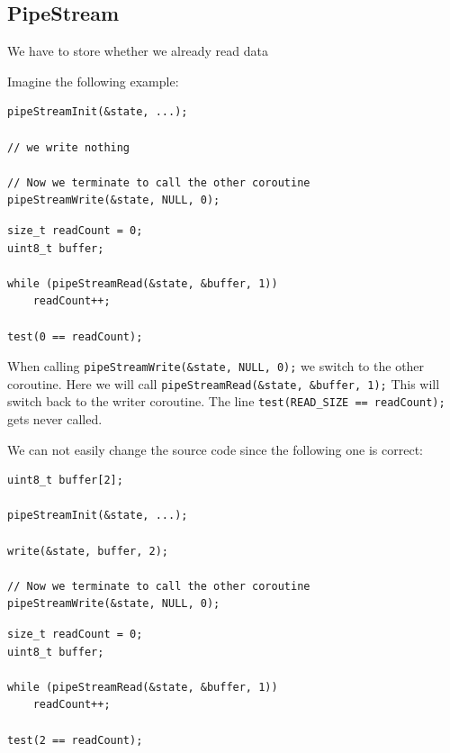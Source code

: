 \documentclass[10pt]{scrbook}
\begin{document}
\subsection{PipeStream}

We have to store whether we already read data 

Imagine the following example:

\begin{lstlisting}[caption=PipeStream example 1 -- writer coroutine, label=lst:pipestream0]
pipeStreamInit(&state, ...);

// we write nothing

// Now we terminate to call the other coroutine
pipeStreamWrite(&state, NULL, 0);
\end{lstlisting}

\begin{lstlisting}[caption=PipeStream example 1 -- reader coroutine, label=lst:pipestream1]
size_t readCount = 0;
uint8_t buffer;

while (pipeStreamRead(&state, &buffer, 1))
	readCount++;

test(0 == readCount);
\end{lstlisting}

When calling \lstinline|pipeStreamWrite(&state, NULL, 0);| we switch to the other coroutine. Here we will call \lstinline|pipeStreamRead(&state, &buffer, 1);| This will switch back to the writer coroutine. The line \lstinline|test(READ_SIZE == readCount);| gets never called.

We can not easily change the source code since the following one is correct:

\begin{lstlisting}[caption=PipeStream example 2 -- writer coroutine, label=lst:pipestream2]
uint8_t buffer[2];

pipeStreamInit(&state, ...);

write(&state, buffer, 2);

// Now we terminate to call the other coroutine
pipeStreamWrite(&state, NULL, 0);
\end{lstlisting}

\begin{lstlisting}[caption=PipeStream example 2 -- reader coroutine, label=lst:pipestream3]
size_t readCount = 0;
uint8_t buffer;

while (pipeStreamRead(&state, &buffer, 1))
	readCount++;

test(2 == readCount);
\end{lstlisting}
\end{document}
